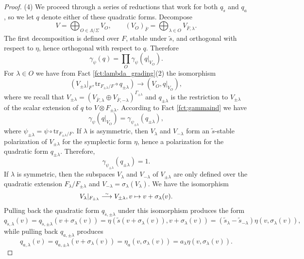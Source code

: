 \documentclass{article}
\def\tx#1{\textrm{#1}}
\def\simto{\buildrel\hbox{\tiny{$\sim$}}\over\longrightarrow}
\theoremstyle{definition}
\numberwithin{equation}{subsection}
\renewcommand{\-}{\hyp{}}
\begin{document}
\begin{proof}
	(4) We proceed through a series of reductions that work for both $q_{\tilde s}$ and $q_a$, so we let $q$ denote either of these quadratic forms. Decompose 
	\[ V = \bigoplus_{O \in \Lambda/\Sigma} V_O,\qquad (V_O)_{\bar F}=\bigoplus_{\lambda \in O} V_{\bar F,\lambda}. \]
	The first decomposition is defined over $F$, stable under $\tilde s$, and orthogonal with respect to $\eta$, hence orthogonal with respect to $q$. Therefore \[ \gamma_\psi(q)=\prod_O \gamma_\psi(q|_{V_O}). \]
	For $\lambda \in O$ we have from Fact \ref{fct:lambda_grading}(2) the isomorphism
	\[ (V_{\pm\lambda}|_{F},\tx{tr}_{F_{\pm\lambda}/F} \circ q_{\pm\lambda}) \to (V_O,q|_{V_O}), \]
	where we recall that $V_{\pm\lambda}=(V_{\bar F,\lambda} \oplus V_{\bar F,-\lambda})^{\Gamma_{\pm \lambda}}$ and $q_{\pm\lambda}$ is the restriction to $V_{\pm\lambda}$ of the scalar extension of $q$ to $V \otimes F_{\pm\lambda}$. According to Fact \ref{fct:gammaind} we have 
	\[ \gamma_\psi(q|_{V_O}) = \gamma_{\psi_{\pm\lambda}}(q_{\pm\lambda}), \]
	where $\psi_{\pm\lambda}=\psi\circ\tx{tr}_{F_{\pm\lambda}/F}$. If $\lambda$ is asymmetric, then $V_\lambda$ and $V_{-\lambda}$ form an $\tilde s$-stable polarization of $V_{\pm\lambda}$ for the symplectic form $\eta$, hence a polarization for the quadratic form $q_{\pm\lambda}$. Therefore, 
	\[ \gamma_{\psi_{\pm\lambda}}(q_{\pm\lambda}) = 1. \]
	If $\lambda$ is symmetric, then the subspaces $V_\lambda$ and $V_{-\lambda}$ of $V_{\pm\lambda}$ are only defined over the quadratic extension $F_\lambda/F_{\pm\lambda}$ and $V_{-\lambda}=\sigma_\lambda(V_\lambda)$. We have the isomorphism 
	\[ V_\lambda|_{F_{\pm\lambda}} \simto V_{\pm\lambda},v \mapsto v+\sigma_\lambda(v). \]
	Pulling back the quadratic form $q_{\tilde s,\pm\lambda}$ under this isomorphism produces the form
	\[ q_{\tilde s,\lambda}(v)=q_{\tilde s,\pm\lambda}(v+\sigma_\lambda(v))
		=\eta(\tilde s(v+\sigma_\lambda(v)),v+\sigma_\lambda(v))
		=(\tilde s_\lambda-\tilde s_{-\lambda})\eta(v,\sigma_\lambda(v)), \]
	while pulling back $q_{a,\pm\lambda}$ produces 
	\[ q_{a,\lambda}(v)=q_{a,\pm\lambda}(v+\sigma_\lambda(v))
		=\eta_a(v,\sigma_\lambda(v))
		=a_\lambda\eta(v,\sigma_\lambda(v)). \]


\end{proof}
\end{document}
